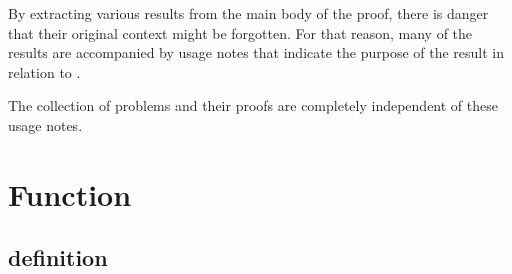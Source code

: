 By extracting various results from the main body of the proof,
there is danger that their original context might be forgotten.
For that reason, many of the results are accompanied by usage
notes that indicate the purpose of the result in relation to \cite{DCG}.

The collection of problems and their proofs are completely independent
of these usage notes.   

\section{Function}

\subsection{definition}\label{def:poly:tarski}

